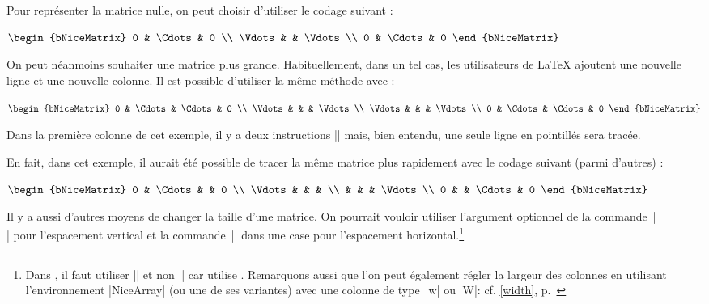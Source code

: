 \documentclass[dvipsnames]{article}
\newcommand{\interitem}{\vspace{7mm plus 2mm minus 3mm}}
\begin{document}
\interitem

Pour représenter la matrice nulle, on peut choisir d'utiliser le codage suivant
:

\nobreak
\medskip
\begin{Code}[width=10cm,show-output]
$\begin{bNiceMatrix}
0      & \Cdots & 0      \\
\Vdots &        & \Vdots \\
0      & \Cdots & 0
\end{bNiceMatrix}$
\end{Code}

\medskip
On peut néanmoins souhaiter une matrice plus grande. Habituellement, dans un tel
cas, les utilisateurs de LaTeX ajoutent une nouvelle ligne et une nouvelle
colonne. Il est possible d'utiliser la même méthode avec 
:

\nobreak
\medskip
\begin{Code}[width=10cm,show-output]
$\begin{bNiceMatrix}
0      & \Cdots & \Cdots & 0      \\
\Vdots &        &        & \Vdots \\
\Vdots &        &        & \Vdots \\
0      & \Cdots & \Cdots & 0
\end{bNiceMatrix}$
\end{Code}

\medskip
Dans la première colonne de cet exemple, il y a deux instructions |\Vdots| mais,
bien entendu, une seule ligne en pointillés sera tracée.

\medskip
En fait, dans cet exemple, il aurait été possible de tracer la même matrice plus
rapidement avec le codage suivant (parmi d'autres) :

\nobreak
\medskip
\begin{Code}[width=10cm,show-output]
$\begin{bNiceMatrix}
0       & \Cdots &        & 0      \\
\Vdots  &        &        &        \\
        &        &        & \Vdots \\
0       &        & \Cdots & 0
\end{bNiceMatrix}$
\end{Code}

\medskip
Il y a aussi d'autres moyens de changer la taille d'une matrice. On pourrait
vouloir utiliser l'argument optionnel de la commande~|\\| pour l'espacement
vertical et la commande~|\hspace*| dans une case pour l'espacement
horizontal.\footnote{Dans , il faut utiliser |\hspace*| et non
  |\hspace| car  utilise . Remarquons aussi que l'on
  peut également régler la largeur des colonnes en utilisant l'environnement
  |{NiceArray}| (ou une de ses variantes) avec une colonne de type~|w| ou |W|:
  cf. \ref{width}, p.~\pageref{width}}
\end{document}

